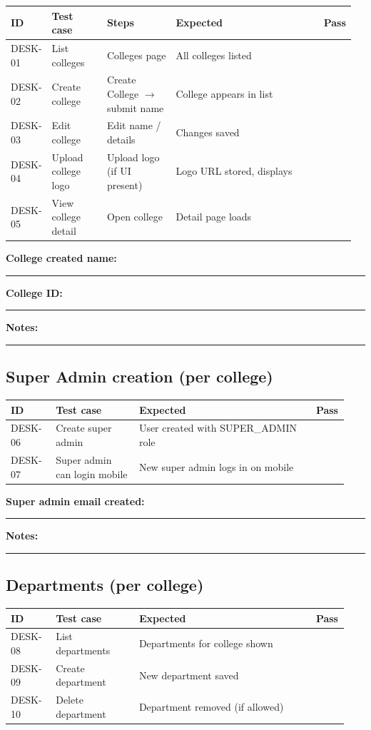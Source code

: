 \documentclass[11pt,a4paper,oneside]{article}
\newcommand{\chk}{\fbox{\rule{0pt}{1.05ex}\rule{1.05ex}{0pt}}}
\newcommand{\fillin}[1][3.5cm]{\rule{#1}{0.4pt}}
\newcommand{\fillinlong}{\rule{0.72\textwidth}{0.4pt}}
\newcommand{\notesblock}{\par\smallskip\noindent\textbf{Notes:}\ \fillinlong\par\smallskip}
\newcommand{\fieldline}[1]{\par\smallskip\noindent\textbf{#1}\ \fillin\par}
\newcommand{\tcheadfour}{%
  \toprule
  \textbf{ID} & \textbf{Test case} & \textbf{Expected} & \textbf{Pass} \\
  \midrule
}
\newcommand{\tcheadfive}{%
  \toprule
  \textbf{ID} & \textbf{Test case} & \textbf{Steps} & \textbf{Expected} & \textbf{Pass} \\
  \midrule
}
\begin{document}
\small
\begin{tabular}{@{}>{\raggedright\arraybackslash}p{0.11\linewidth} >{\raggedright\arraybackslash}p{0.16\linewidth} >{\raggedright\arraybackslash}p{0.20\linewidth} >{\raggedright\arraybackslash}p{0.43\linewidth} >{\centering\arraybackslash}p{0.06\linewidth}@{}}
  \tcheadfive
  DESK-01 & List colleges        & Colleges page                    & All colleges listed              & \chk \\
  DESK-02 & Create college       & Create College $\rightarrow$ submit name & College appears in list  & \chk \\
  DESK-03 & Edit college         & Edit name / details              & Changes saved                    & \chk \\
  DESK-04 & Upload college logo  & Upload logo (if UI present)      & Logo URL stored, displays        & \chk \\
  DESK-05 & View college detail  & Open college                     & Detail page loads                & \chk \\
  \bottomrule
\end{tabular}
\normalsize

\fieldline{College created name:}
\fieldline{College ID:}
\notesblock

\subsection{Super Admin creation (per college)}

\small
\begin{tabular}{@{}>{\raggedright\arraybackslash}p{0.13\linewidth} >{\raggedright\arraybackslash}p{0.24\linewidth} >{\raggedright\arraybackslash}p{0.51\linewidth} >{\centering\arraybackslash}p{0.06\linewidth}@{}}
  \tcheadfour
  DESK-06 & Create super admin              & User created with SUPER\_ADMIN role      & \chk \\
  DESK-07 & Super admin can login mobile    & New super admin logs in on mobile        & \chk \\
  \bottomrule
\end{tabular}
\normalsize

\fieldline{Super admin email created:}
\notesblock

\subsection{Departments (per college)}

\small
\begin{tabular}{@{}>{\raggedright\arraybackslash}p{0.13\linewidth} >{\raggedright\arraybackslash}p{0.24\linewidth} >{\raggedright\arraybackslash}p{0.51\linewidth} >{\centering\arraybackslash}p{0.06\linewidth}@{}}
  \tcheadfour
  DESK-08 & List departments    & Departments for college shown & \chk \\
  DESK-09 & Create department   & New department saved          & \chk \\
  DESK-10 & Delete department   & Department removed (if allowed) & \chk \\
  \bottomrule
\end{tabular}
\normalsize
\end{document}
